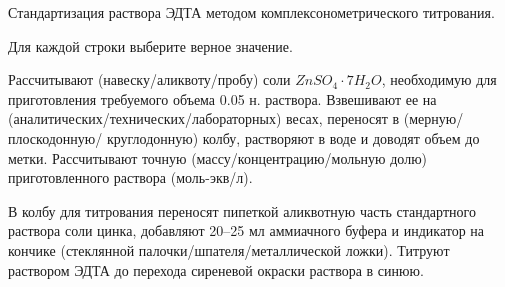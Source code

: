 
Стандартизация
раствора ЭДТА методом комплексонометрического титрования.

Для каждой строки выберите верное значение.

Рассчитывают (навеску/аликвоту/пробу) соли $ZnSO_4 \cdot 7H_2O$, необходимую для приготовления требуемого объема 0.05 н. 
раствора. Взвешивают ее на (аналитических/технических/лабораторных) весах, переносят в (мерную/плоскодонную/
круглодонную) колбу, растворяют в воде и доводят объем до метки. 
Рассчитывают точную (массу/концентрацию/мольную долю) приготовленного раствора (моль-экв/л). 

В колбу для титрования переносят пипеткой аликвотную часть стандартного раствора соли цинка, добавляют 
20–25 мл аммиачного буфера и индикатор на кончике (стеклянной палочки/шпателя/металлической ложки). Титруют раствором ЭДТА до перехода сиреневой 
окраски раствора в синюю.

